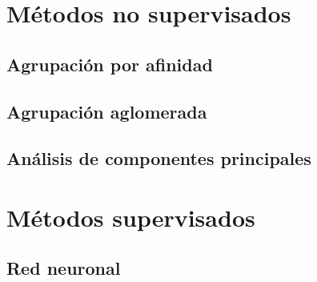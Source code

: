 \section{Métodos no supervisados}

\subsection{Agrupación por afinidad}

\subsection{Agrupación aglomerada}

\subsection{Análisis de componentes principales}

\section{Métodos supervisados}

\subsection{Red neuronal}